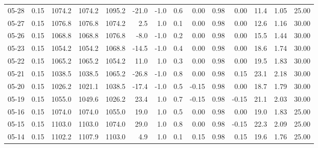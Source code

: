 \begin{threeparttable}
{\begin{tabular}{lrrrrrrrrrrrrr}
  05-28 &     0.15 & 1074.2 & 1074.2 & 1095.2 &      -21.0 &                     -1.0 &                 0.6 &       0.00 &      0.98 &           0.00 &             11.4 &            1.05 &                  25.00 \\
  05-27 &     0.15 & 1076.8 & 1076.8 & 1074.2 &        2.5 &                      1.0 &                 0.1 &       0.00 &      0.98 &           0.00 &             12.6 &            1.16 &                  30.00 \\
  05-26 &     0.15 & 1068.8 & 1068.8 & 1076.8 &       -8.0 &                     -1.0 &                 0.2 &       0.00 &      0.98 &           0.00 &             15.5 &            1.44 &                  30.00 \\
  05-23 &     0.15 & 1054.2 & 1054.2 & 1068.8 &      -14.5 &                     -1.0 &                 0.4 &       0.00 &      0.98 &           0.00 &             18.6 &            1.74 &                  30.00 \\
  05-22 &     0.15 & 1065.2 & 1065.2 & 1054.2 &       11.0 &                      1.0 &                 0.3 &       0.00 &      0.98 &           0.00 &             19.5 &            1.83 &                  30.00 \\
  05-21 &     0.15 & 1038.5 & 1038.5 & 1065.2 &      -26.8 &                     -1.0 &                 0.8 &       0.00 &      0.98 &           0.15 &             23.1 &            2.18 &                  30.00 \\
  05-20 &     0.15 & 1026.2 & 1021.1 & 1038.5 &      -17.4 &                     -1.0 &                 0.5 &      -0.15 &      0.98 &           0.00 &             18.7 &            1.79 &                  30.00 \\
  05-19 &     0.15 & 1055.0 & 1049.6 & 1026.2 &       23.4 &                      1.0 &                 0.7 &      -0.15 &      0.98 &          -0.15 &             21.1 &            2.03 &                  30.00 \\
  05-16 &     0.15 & 1074.0 & 1074.0 & 1055.0 &       19.0 &                      1.0 &                 0.5 &       0.00 &      0.98 &           0.00 &             19.0 &            1.83 &                  25.00 \\
  05-15 &     0.15 & 1103.0 & 1103.0 & 1074.0 &       29.0 &                      1.0 &                 0.8 &       0.00 &      0.98 &          -0.15 &             22.3 &            2.09 &                  25.00 \\
  05-14 &     0.15 & 1102.2 & 1107.9 & 1103.0 &        4.9 &                      1.0 &                 0.1 &       0.15 &      0.98 &           0.15 &             19.6 &            1.76 &                  25.00 \\

\end{tabular}}
\end{threeparttable}
